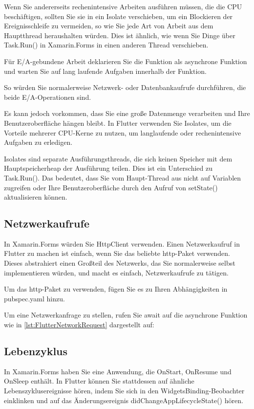Wenn Sie andererseits rechenintensive Arbeiten ausführen müssen, die die CPU beschäftigen, sollten Sie sie in ein Isolate verschieben, um ein Blockieren der Ereignisschleife zu vermeiden, so wie Sie jede Art von Arbeit aus dem Hauptthread heraushalten würden. Dies ist ähnlich, wie wenn Sie Dinge über Task.Run() in Xamarin.Forms in einen anderen Thread verschieben.

Für E/A-gebundene Arbeit deklarieren Sie die Funktion als asynchrone Funktion und warten Sie auf lang laufende Aufgaben innerhalb der Funktion.

So würden Sie normalerweise Netzwerk- oder Datenbankaufrufe durchführen, die beide E/A-Operationen sind.

Es kann jedoch vorkommen, dass Sie eine große Datenmenge verarbeiten und Ihre Benutzeroberfläche hängen bleibt. In Flutter verwenden Sie Isolates, um die Vorteile mehrerer CPU-Kerne zu nutzen, um langlaufende oder rechenintensive Aufgaben zu erledigen.

Isolates sind separate Ausführungsthreads, die sich keinen Speicher mit dem Hauptspeicherheap der Ausführung teilen. Dies ist ein Unterschied zu Task.Run(). Das bedeutet, dass Sie vom Haupt-Thread aus nicht auf Variablen zugreifen oder Ihre Benutzeroberfläche durch den Aufruf von setState() aktualisieren können.
\subsection{Netzwerkaufrufe}
In Xamarin.Forms würden Sie HttpClient verwenden. Einen Netzwerkaufruf in Flutter zu machen ist einfach, wenn Sie das beliebte http-Paket verwenden. Dieses abstrahiert einen Großteil des Netzwerks, das Sie normalerweise selbst implementieren würden, und macht es einfach, Netzwerkaufrufe zu tätigen.

Um das http-Paket zu verwenden, fügen Sie es zu Ihren Abhängigkeiten in pubspec.yaml hinzu.

Um eine Netzwerkanfrage zu stellen, rufen Sie await auf die asynchrone Funktion wie in \ref{lst:FlutterNetworkRequest} dargestellt auf:


\begin{minipage}{\linewidth}

\end{minipage}

\subsection{Lebenzyklus}
In Xamarin.Forms haben Sie eine Anwendung, die OnStart, OnResume und OnSleep enthält. In Flutter können Sie stattdessen auf ähnliche Lebenszyklusereignisse hören, indem Sie sich in den WidgetsBinding-Beobachter einklinken und auf das Änderungsereignis didChangeAppLifecycleState() hören.

